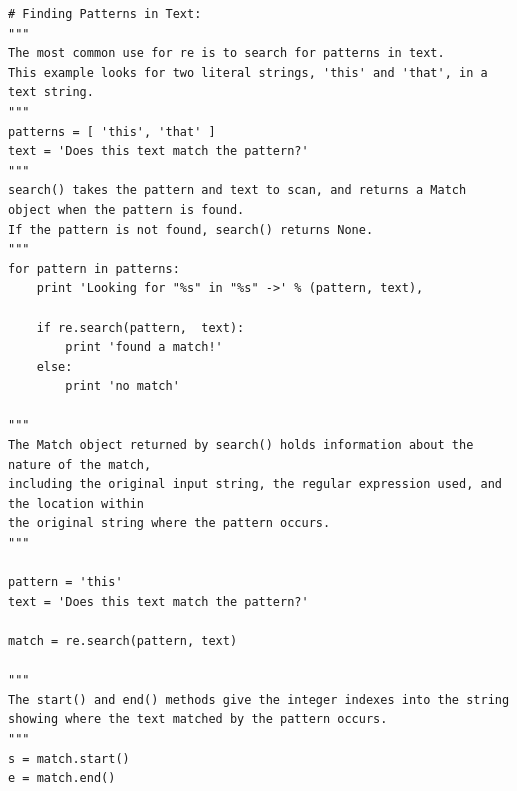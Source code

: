 \documentclass{article}
\begin{document}
\begin{enumerate}
\begin{verbatim}
# Finding Patterns in Text: 
"""
The most common use for re is to search for patterns in text.
This example looks for two literal strings, 'this' and 'that', in a text string.
"""
patterns = [ 'this', 'that' ]
text = 'Does this text match the pattern?'
"""
search() takes the pattern and text to scan, and returns a Match object when the pattern is found. 
If the pattern is not found, search() returns None.
"""
for pattern in patterns:
    print 'Looking for "%s" in "%s" ->' % (pattern, text),

    if re.search(pattern,  text):
        print 'found a match!'
    else:
        print 'no match'

"""
The Match object returned by search() holds information about the nature of the match,
including the original input string, the regular expression used, and the location within
the original string where the pattern occurs.
"""

pattern = 'this'
text = 'Does this text match the pattern?'

match = re.search(pattern, text)

"""
The start() and end() methods give the integer indexes into the string showing where the text matched by the pattern occurs.
"""
s = match.start()
e = match.end()


\end{verbatim}
\end{enumerate}
\end{document}
